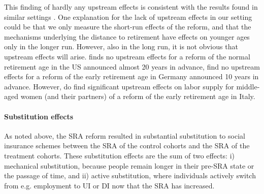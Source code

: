 \documentclass[12pt,a4paper]{article}
\begin{document}
This finding of hardly any upstream effects is consistent with the results found in similar settings \citep[see e.g.][]{staubli_does_2013}. %
One explanation for the lack of upstream effects in our setting could be that we only measure the short-run effects of the reform, and that the mechanisms underlying the distance to retirement have effects on younger ages only in the longer run. However, also in the long run, it is not obvious that upstream effects will arise. \cite{mastrobuoni_labor_2009} finds no upstream effects for a reform of the normal retirement age in the US announced almost 20 years in advance, \cite{geyer_closing_2021} find no upstream effects for a reform of the early retirement age in Germany announced 10 years in advance. However, \cite{carta2021working} do find significant upstream effects on labor supply for middle-aged women (and their partners) of a reform of the early retirement age in Italy.

%

\paragraph{Substitution effects} As noted above, the SRA reform resulted in substantial substitution to social insurance schemes between the SRA of the control cohorts and the SRA of the treatment cohorts. These substitution effects are the sum of two effects: i) mechanical substitution, because people remain longer in their pre-SRA state or the passage of time, and ii) active substitution, where individuals actively switch from e.g. employment to UI or DI now that the SRA has increased.   
\end{document}
